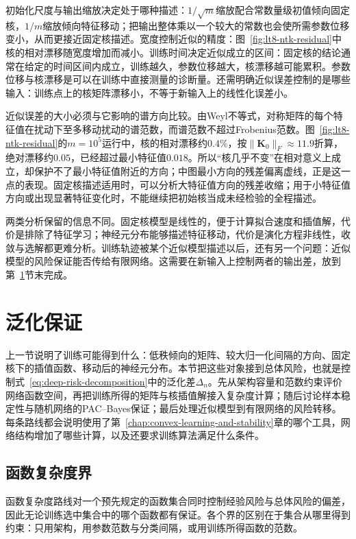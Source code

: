 初始化尺度与输出缩放决定处于哪种描述：$1/\sqrt m$缩放配合常数量级初值倾向固定核，$1/m$缩放倾向特征移动；把输出整体乘以一个较大的常数也会使所需参数位移变小，从而更接近固定核描述。宽度控制近似的精度：图~\ref{fig:lt8-ntk-residual}中核的相对漂移随宽度增加而减小。训练时间决定近似成立的区间：固定核的结论通常在给定的时间区间内成立，训练越久，参数位移越大，核漂移越可能累积。参数位移与核漂移是可以在训练中直接测量的诊断量。还需明确近似误差控制的是哪些输入：训练点上的核矩阵漂移小，不等于新输入上的线性化误差小。

近似误差的大小必须与它影响的谱方向比较。由Weyl不等式，对称矩阵的每个特征值在扰动下至多移动扰动的谱范数，而谱范数不超过Frobenius范数。图~\ref{fig:lt8-ntk-residual}的$m=10^5$运行中，核的相对漂移约$0.4\%$，按$\|\bm K_0\|_F\approx11.9$折算，绝对漂移约$0.05$，已经超过最小特征值$0.018$。所以“核几乎不变”在相对意义上成立，却保护不了最小特征值附近的方向；中图最小方向的残差偏离虚线，正是这一点的表现。固定核描述适用时，可以分析大特征值方向的残差收缩；用于小特征值方向或出现显著特征变化时，不能继续把初始核当成未经检验的全程描述。

两类分析保留的信息不同。固定核模型是线性的，便于计算拟合速度和插值解，代价是排除了特征学习；神经元分布能够描述特征移动，代价是演化方程非线性，收敛与选解都更难分析。训练轨迹被某个近似模型描述以后，还有另一个问题：近似模型的风险保证能否传给有限网络。这需要在新输入上控制两者的输出差，放到第~\ref{sec:network-generalization}节末完成。

\section{泛化保证}
\label{sec:network-generalization}

上一节说明了训练可能得到什么：低秩倾向的矩阵、较大归一化间隔的方向、固定核下的插值函数、移动后的神经元分布。本节把这些对象接到总体风险，也就是控制式~\eqref{eq:deep-risk-decomposition}中的泛化差$\Delta_n$。先从架构容量和范数约束评价网络函数空间，再把训练所得的矩阵与核插值解接入复杂度计算；随后讨论样本稳定性与随机网络的PAC--Bayes保证；最后处理近似模型到有限网络的风险转移。每条路线都会说明使用了第~\ref{chap:convex-learning-and-stability}章的哪个工具，网络结构增加了哪些计算，以及还要求训练算法满足什么条件。

\subsection{函数复杂度界}
\label{sec:network-norm-bounds}

函数复杂度路线对一个预先规定的函数集合同时控制经验风险与总体风险的偏差，因此无论训练选中集合中的哪个函数都有保证。各个界的区别在于集合从哪里得到约束：只用架构，用参数范数与分类间隔，或用训练所得函数的范数。

